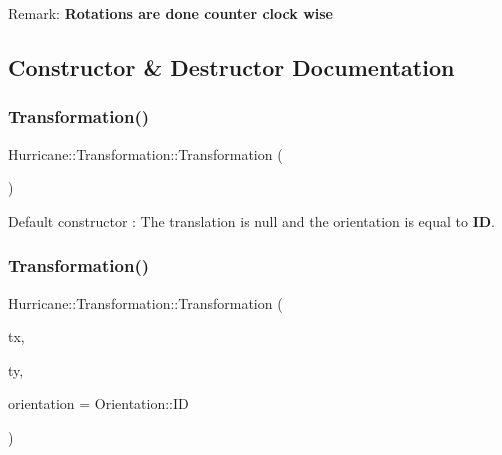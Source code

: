 \begin{DoxyParagraph}{Remark\+:}
{\bfseries Rotations are done counter clock wise} 
\end{DoxyParagraph}


\subsection{Constructor \& Destructor Documentation}
\mbox{\label{classHurricane_1_1Transformation_a7a28cd6c2f62898bc947dc3f41fe3bcf}} 
\subsubsection{\texorpdfstring{Transformation()}{Transformation()}\hspace{0.1cm}{\footnotesize\ttfamily [1/4]}}
{\footnotesize\ttfamily Hurricane\+::\+Transformation\+::\+Transformation (\begin{DoxyParamCaption}{ }\end{DoxyParamCaption})}

Default constructor \+: The translation is null and the orientation is equal to {\bfseries ID}. \mbox{\label{classHurricane_1_1Transformation_a6bb0e856cd0374bd6f38ee835a4744c0}} 
\subsubsection{\texorpdfstring{Transformation()}{Transformation()}\hspace{0.1cm}{\footnotesize\ttfamily [2/4]}}
{\footnotesize\ttfamily Hurricane\+::\+Transformation\+::\+Transformation (\begin{DoxyParamCaption}\item[{const \hyperlink{group__DbUGroup_ga4fbfa3e8c89347af76c9628ea06c4146}{Db\+U\+::\+Unit} \&}]{tx,  }\item[{const \hyperlink{group__DbUGroup_ga4fbfa3e8c89347af76c9628ea06c4146}{Db\+U\+::\+Unit} \&}]{ty,  }\item[{const \hyperlink{classHurricane_1_1Transformation_1_1Orientation}{Orientation} \&}]{orientation = {\ttfamily Orientation\+:\+:ID} }\end{DoxyParamCaption})}

